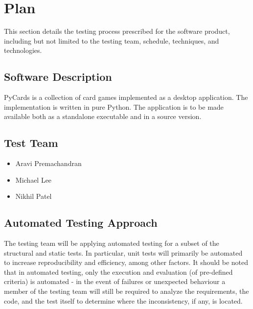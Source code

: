\documentclass[12pt, titlepage]{article}
\begin{document}
	\section{Plan}
	This section details the testing process prescribed for the software 
	product, including but not limited to the testing team, schedule, 
	techniques, and technologies.
	\subsection{Software Description}
	PyCards is a collection of card games implemented as a desktop application.
	The implementation is written in pure Python. The application is to be made
	available both as a standalone executable and in a source version.
	\subsection{Test Team}
	\begin{itemize}
		\itemsep0em
		\item Aravi Premachandran
		\item Michael Lee
		\item Nikhil Patel
	\end{itemize}
	\subsection{Automated Testing Approach}
	\indent \indent The testing team will be applying automated testing for a 
	subset of the structural and static tests. In particular, unit tests will 
	primarily be automated to increase reproducibility and efficiency, among 
	other factors. It should be noted that in automated testing, only the 
	execution and evaluation (of pre-defined criteria) is automated - in the 
	event of failures or unexpected behaviour a member of the testing team will 
	still be required to analyze the requirements, the code, and the test 
	itself to determine where the inconsistency, if any, is located.
	
\end{document}
